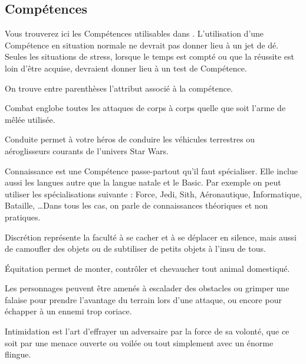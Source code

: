 \subsection{Compétences}
Vous trouverez ici les Compétences utilisables dans \swfe. L’utilisation d’une Compétence en situation normale ne devrait pas donner lieu à un jet de dé. Seules les situations de stress, lorsque le temps est compté ou que la réussite est loin d’être acquise, devraient donner lieu à un test de Compétence.

On trouve entre parenthèses l’attribut associé à la compétence.

\begin{description}[align=left]
    \item [Combat (Agi)]
        Combat englobe toutes les attaques de corps à corps quelle que soit l’arme de mêlée utilisée.

    \item [Conduite (Agi)]
        Conduite permet à votre héros de conduire les véhicules terrestres ou aéroglisseurs courants de l’univers Star Wars.

    \item [Connaissance (Int)]
        Connaissance est une Compétence passe-partout qu’il faut spécialiser. Elle inclue aussi les langues autre que la langue natale et le Basic. Par exemple on peut utiliser les spécialisations suivante : Force, Jedi, Sith, Aéronautique, Informatique, Bataille, \ldots Dans tous les cas, on parle de connaissances théoriques et non pratiques.

    \item [Discrétion (Agi)]
        Discrétion représente la faculté à se cacher et à se déplacer en silence, mais aussi de camoufler des objets ou de subtiliser de petits objets à l’insu de tous.

    \item [\'Equitation (Agi)]
        \'Equitation permet de monter, contrôler et chevaucher tout animal domestiqué.

    \item [Escalade (For)]
        Les personnages peuvent être amenés à escalader des obstacles ou grimper une falaise pour prendre l’avantage du terrain lors d’une attaque, ou encore pour échapper à un ennemi trop coriace.

    \item [Intimidation (\^Ame)]
        Intimidation est l’art d’effrayer un adversaire par la force de sa volonté, que ce soit par une menace ouverte ou voilée ou tout simplement avec un énorme flingue.


\end{description}
